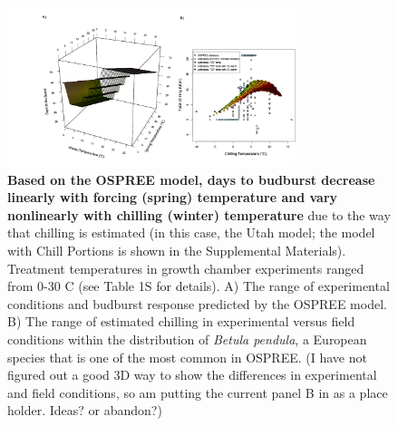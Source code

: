 \documentclass{article}
\begin{document}
\newpage
\begin{figure}[h!]
\centering
\noindent \includegraphics[width=0.75\textwidth]{..//..//analyses/bb_analysis/figures/bbmod_3dplot_utah_edited_withchillingfig.png}
\caption{\textbf{Based on the OSPREE model, days to budburst decrease linearly with forcing (spring) temperature and vary nonlinearly with chilling (winter) temperature} due to the way that chilling is estimated (in this case, the Utah model; the model with Chill Portions is shown in the Supplemental Materials). Treatment temperatures in growth chamber experiments ranged from 0-30 \degree C (see Table 1S for details). A) The range of experimental conditions and budburst response predicted by the OSPREE model. B) The range of estimated chilling in experimental versus field conditions within the distribution of \emph{Betula pendula}, a European species that is one of the most common in OSPREE. (I have not figured out a good 3D way to show the differences in experimental and field conditions, so am putting the current panel B in as a place holder. Ideas? or abandon?)
}
\label{fig:apc}
\end{figure}
\newpage
\end{document}

